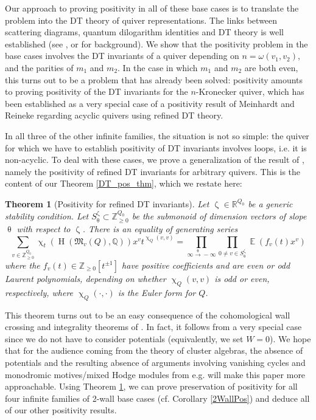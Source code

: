 \documentclass{amsart}
\newcommand{\Mst}{\mathfrak{M}}
\DeclareMathOperator{\HO}{H}
\DeclareMathOperator{\EE}{\mathbb{E}}
\let\bb=\mathbb
\renewcommand{\theta}{\uptheta}
\renewcommand{\zeta}{\upzeta}
\renewcommand{\chi}{\upchi}
\theoremstyle{plain}%
\newtheorem{thm}{Theorem}[section]
\theoremstyle{definition}
\theoremstyle{remark}
\begin{document}
Our approach to proving positivity in all of these base cases is to translate the problem into the DT theory of quiver representations.  The links between scattering diagrams, quantum dilogarithm identities and DT theory is well established (see \cite{Keller}, \cite{WCS} or \cite{Bridge} for background).  We show that the positivity problem in the base cases involves the DT invariants of a quiver depending on $n=\omega(v_1,v_2)$, and the parities of $m_1$ and $m_2$.  In the case in which $m_1$ and $m_2$ are both even, this turns out to be a problem that has already been solved: positivity amounts to proving positivity of the DT invariants for the $n$-Kronecker quiver, which has been established as a very special case of a positivity result of Meinhardt and Reineke regarding acyclic quivers \cite{MeiRei} using refined DT theory.

In all three of the other infinite families, the situation is not so simple: the quiver for which we have to establish positivity of DT invariants involves loops, i.e. it is non-acyclic.  To deal with these cases, we prove a generalization of the result of \cite{MeiRei}, namely the positivity of refined DT invariants for arbitrary quivers.  This is the content of our Theorem \ref{DT_pos_thm}, which we restate here:
\begin{thm}[Positivity for refined DT invariants]
\label{DTpos_restate}
Let $\zeta\in \mathbb{R}^{Q_0}$ be a generic stability condition.  Let $S_{\theta}^{\zeta}\subset \bb{Z}_{\geq 0}^{Q_0}$ be the submonoid of dimension vectors of slope $\theta$ with respect to $\zeta$.  There is an equality of generating series 
\begin{equation*}
\sum_{v\in \mathbb{Z}_{\geq 0}^{Q_0}}\chi_{t}(\HO(\Mst_v(Q),\mathbb{Q}))x^vt^{\chi_Q(v,v)}=\prod_{\infty\xrightarrow{\theta} -\infty}\prod_{0\neq v\in S_{\theta}^{\zeta}}\EE(f_v(t)x^v)
\end{equation*}
where the $f_v(t)\in\mathbb{Z}_{\geq 0}[t^{\pm 1}]$ have positive coefficients and are even or odd Laurent polynomials, depending on whether $\chi_Q(v,v)$ is odd or even, respectively, where $\chi_Q(\cdot,\cdot)$ is the Euler form for $Q$.
\end{thm}
This theorem turns out to be an easy consequence of the cohomological wall crossing and integrality theorems of \cite{DavMei}.  In fact, it follows from a very special case since we do not have to consider potentials (equivalently, we set $W=0$).  We hope that for the audience coming from the theory of cluster algebras, the absence of potentials and the resulting absence of arguments involving vanishing cycles and monodromic motives/mixed Hodge modules from e.g. \cite{Nagao, Efi, DavPos} will make this paper more approachable.  Using Theorem \ref{DTpos_restate}, we can prove preservation of positivity for all four infinite families of 2-wall base cases (cf. Corollary \ref{2WallPos}) and deduce all of our other positivity results.
\end{document}
